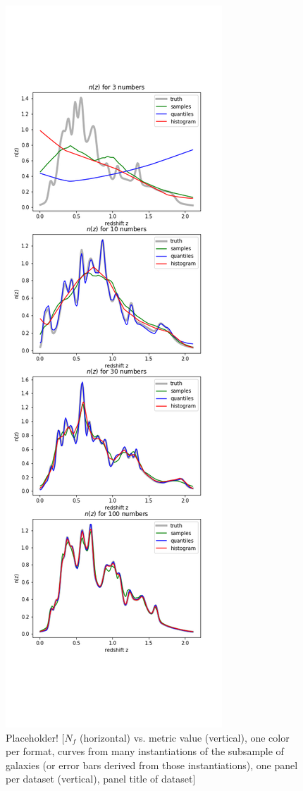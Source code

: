 \documentclass[\docopts]{\docclass}
\begin{document}
\begin{figure}
  \includegraphics[width=0.9\columnwidth]{figures/stacked_placeholder.png}
  \caption{Placeholder! [$N_{f}$ (horizontal) vs. metric value (vertical), one 
color per format, curves from many instantiations of the subsample of galaxies 
(or error bars derived from those instantiations), one panel per dataset 
(vertical), panel title of dataset]
  \label{fig:stacked}}
\end{figure}
\end{document}
